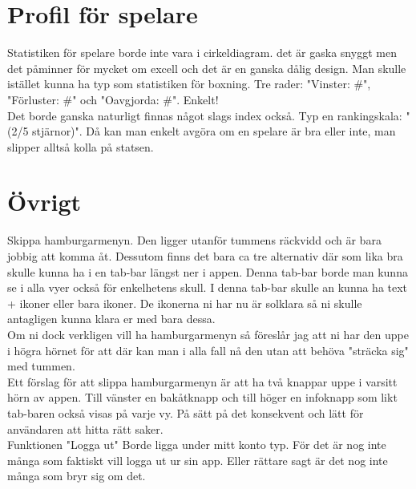 \documentclass[11pt,a4paper]{article}
\begin{document}
\section{Profil för spelare}
Statistiken för spelare borde inte vara i cirkeldiagram. det är gaska snyggt men det påminner för mycket om excell och det är en ganska dålig design. Man skulle istället kunna ha typ som statistiken för boxning. Tre rader: "Vinster: #", "Förluster: #" och "Oavgjorda: #". Enkelt!\\
Det borde ganska naturligt finnas något slags index också. Typ en rankingskala: "(2/5 stjärnor)". Då kan man enkelt avgöra om en spelare är bra eller inte, man slipper alltså kolla på statsen.

\section{Övrigt}
Skippa hamburgarmenyn. Den ligger utanför tummens räckvidd och är bara jobbig att komma åt. Dessutom finns det bara ca tre alternativ där som lika bra skulle kunna ha i en tab-bar längst ner i appen. Denna tab-bar borde man kunna se i alla vyer också för enkelhetens skull. I denna tab-bar skulle an kunna ha text + ikoner eller bara ikoner. De ikonerna ni har nu är solklara så ni skulle antagligen kunna klara er med bara dessa.\\
Om ni dock verkligen vill ha hamburgarmenyn så föreslår jag att ni har den uppe i högra hörnet för att där kan man i alla fall nå den utan att behöva "sträcka sig" med tummen.\\

Ett förslag för att slippa hamburgarmenyn är att ha två knappar uppe i varsitt hörn av appen. Till vänster en bakåtknapp och till höger en infoknapp som likt tab-baren också visas på varje vy. På sätt på det konsekvent och lätt för användaren att hitta rätt saker.\\

Funktionen "Logga ut" Borde ligga under mitt konto typ. För det är nog inte många som faktiskt vill logga ut ur sin app. Eller rättare sagt är det nog inte många som bryr sig om det.
\end{document}
